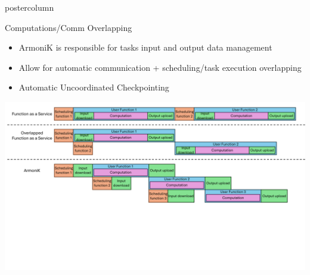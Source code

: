 \begin{frame}[fragile]
  \begin{columns}[T]
    \begin{column}{.49\textwidth}
      \begin{beamercolorbox}[center,wd=\textwidth]{postercolumn}
        \begin{minipage}[T]{.96\textwidth}
          \begin{block}{Computations/Comm Overlapping}
              \begin{itemize}
              \item ArmoniK is responsible for tasks input and output data management
              \item Allow for automatic communication + scheduling/task execution overlapping
              \item Automatic Uncoordinated Checkpointing
              \end{itemize}
              \vspace{3ex}
              \centering
              \includegraphics[width=\textwidth, trim={0 6.5cm 0 0}, clip]{pipelining AK 2.pdf}
          \end{block}
        \end{minipage}
      \end{beamercolorbox}
    \end{column}


\end{columns}
\end{frame}
